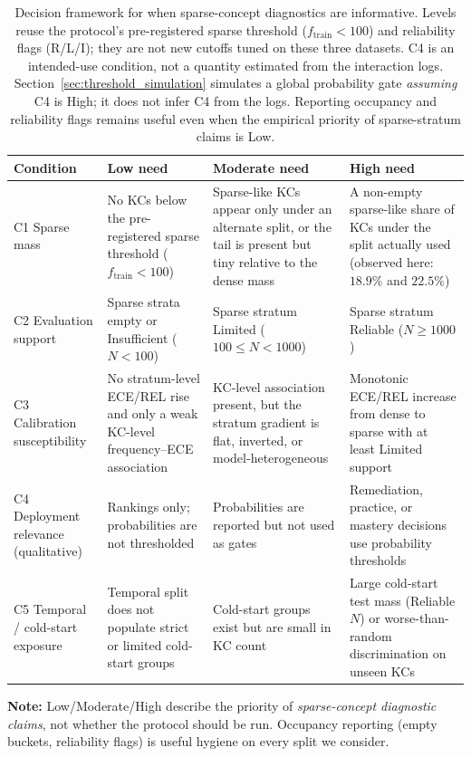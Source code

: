 \begin{table}[htbp]
\caption{Decision framework for when sparse-concept diagnostics are informative. Levels reuse the protocol's pre-registered sparse threshold ($f_{\mathrm{train}}<100$) and reliability flags (R/L/I); they are not new cutoffs tuned on these three datasets. C4 is an intended-use condition, not a quantity estimated from the interaction logs. Section~\ref{sec:threshold_simulation} simulates a global probability gate \emph{assuming} C4 is High; it does not infer C4 from the logs. Reporting occupancy and reliability flags remains useful even when the empirical priority of sparse-stratum claims is Low.}
\label{tab:a8_need_framework}
\centering
\footnotesize
\setlength{\tabcolsep}{3.5pt}
\begin{tabularx}{\textwidth}{>{\raggedright\arraybackslash}p{2.6cm}XXX}
\toprule
\textbf{Condition} & \textbf{Low need} & \textbf{Moderate need} & \textbf{High need} \\
\midrule
C1 Sparse mass & No KCs below the pre-registered sparse threshold ($f_{\mathrm{train}}<100$) & Sparse-like KCs appear only under an alternate split, or the tail is present but tiny relative to the dense mass & A non-empty sparse-like share of KCs under the split actually used (observed here: $18.9\%$ and $22.5\%$) \\
\midrule
C2 Evaluation support & Sparse strata empty or Insufficient ($N<100$) & Sparse stratum Limited ($100\le N<1000$) & Sparse stratum Reliable ($N\ge 1000$) \\
\midrule
C3 Calibration susceptibility & No stratum-level ECE/REL rise and only a weak KC-level frequency--ECE association & KC-level association present, but the stratum gradient is flat, inverted, or model-heterogeneous & Monotonic ECE/REL increase from dense to sparse with at least Limited support \\
\midrule
C4 Deployment relevance (qualitative) & Rankings only; probabilities are not thresholded & Probabilities are reported but not used as gates & Remediation, practice, or mastery decisions use probability thresholds \\
\midrule
C5 Temporal / cold-start exposure & Temporal split does not populate strict or limited cold-start groups & Cold-start groups exist but are small in KC count & Large cold-start test mass (Reliable $N$) or worse-than-random discrimination on unseen KCs \\
\bottomrule
\end{tabularx}

\vspace{1ex}
{\scriptsize \textbf{Note:} Low/Moderate/High describe the priority of \emph{sparse-concept diagnostic claims}, not whether the protocol should be run. Occupancy reporting (empty buckets, reliability flags) is useful hygiene on every split we consider.\par}
\end{table}
